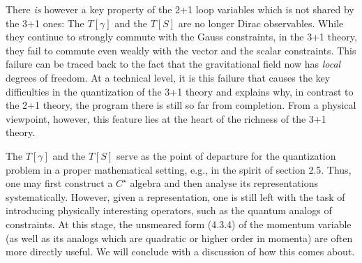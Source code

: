 There {\it is} however a key property of the 2+1 loop variables which is not
shared by the 3+1 ones: The $T[\gamma ]$ and the $T[S]$ are no longer Dirac
observables. While they continue to strongly commute with the
Gauss constraints, in the 3+1 theory, they fail to commute even weakly
with the vector and the scalar constraints. This failure can be traced
back to the fact that the gravitational field now has {\it local} degrees
of freedom. At a technical level, it is this failure that causes the
key difficulties in the quantization of the 3+1 theory and explains why, in
contrast to the 2+1 theory, the program there is still so far from
completion. From a physical viewpoint, however, this feature lies at the
heart of the richness of the 3+1 theory.

The $T[\gamma]$ and the $T[S]$ serve as the point of departure for
the quantization problem in a proper mathematical setting, e.g., in the
spirit of section 2.5. Thus, one may first construct a $C^\star$ algebra
and then analyse its representations systematically. However, given
a representation, one is still left with the task of introducing physically
interesting operators, such as the quantum analogs of constraints. At this
stage, the unsmeared form (4.3.4) of the momentum variable (as well as its
analogs which are quadratic or higher order in momenta) are often more
directly useful. We will conclude with a discussion of how this comes about.

